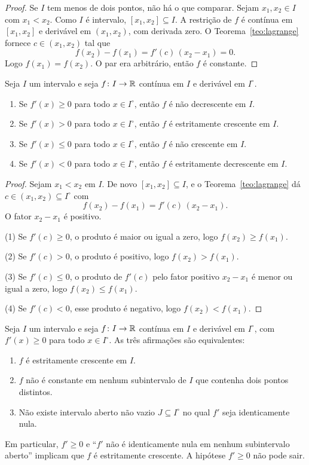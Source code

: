 \documentclass[11pt,a4paper]{article}
\begin{document}
\begin{proof}
Se $I$ tem menos de dois pontos, não há o que comparar. Sejam $x_1,x_2\in I$ com $x_1<x_2$. Como $I$ é intervalo, $[x_1,x_2]\subseteq I$. A restrição de $f$ é contínua em $[x_1,x_2]$ e derivável em $(x_1,x_2)$, com derivada zero. O Teorema~\ref{teo:lagrange} fornece $c\in(x_1,x_2)$ tal que
\[
f(x_2)-f(x_1)=f'(c)\,(x_2-x_1)=0.
\]
Logo $f(x_1)=f(x_2)$. O par era arbitrário, então $f$ é constante.
\end{proof}

\begin{corolario}\label{cor:sinal}
Seja $I$ um intervalo e seja $f\colon I\to\mathbb{R}$ contínua em $I$ e derivável em $I^\circ$.
\begin{enumerate}
\item Se $f'(x)\ge 0$ para todo $x\in I^\circ$, então $f$ é não decrescente em $I$.
\item Se $f'(x)>0$ para todo $x\in I^\circ$, então $f$ é estritamente crescente em $I$.
\item Se $f'(x)\le 0$ para todo $x\in I^\circ$, então $f$ é não crescente em $I$.
\item Se $f'(x)<0$ para todo $x\in I^\circ$, então $f$ é estritamente decrescente em $I$.
\end{enumerate}
\end{corolario}

\begin{proof}
Sejam $x_1<x_2$ em $I$. De novo $[x_1,x_2]\subseteq I$, e o Teorema~\ref{teo:lagrange} dá $c\in(x_1,x_2)\subseteq I^\circ$ com
\[
f(x_2)-f(x_1)=f'(c)\,(x_2-x_1).
\]
O fator $x_2-x_1$ é positivo.

(1) Se $f'(c)\ge 0$, o produto é maior ou igual a zero, logo $f(x_2)\ge f(x_1)$.

(2) Se $f'(c)>0$, o produto é positivo, logo $f(x_2)>f(x_1)$.

(3) Se $f'(c)\le 0$, o produto de $f'(c)$ pelo fator positivo $x_2-x_1$ é menor ou igual a zero, logo $f(x_2)\le f(x_1)$.

(4) Se $f'(c)<0$, esse produto é negativo, logo $f(x_2)<f(x_1)$.
\end{proof}

\begin{proposicao}\label{prop:criterio-fino}
Seja $I$ um intervalo e seja $f\colon I\to\mathbb{R}$ contínua em $I$ e derivável em $I^\circ$, com $f'(x)\ge 0$ para todo $x\in I^\circ$. As três afirmações são equivalentes:
\begin{enumerate}
\item $f$ é estritamente crescente em $I$.
\item $f$ não é constante em nenhum subintervalo de $I$ que contenha dois pontos distintos.
\item Não existe intervalo aberto não vazio $J\subseteq I^\circ$ no qual $f'$ seja identicamente nula.
\end{enumerate}
Em particular, $f'\ge 0$ e ``$f'$ não é identicamente nula em nenhum subintervalo aberto'' implicam que $f$ é estritamente crescente. A hipótese $f'\ge 0$ não pode sair.
\end{proposicao}
\end{document}
